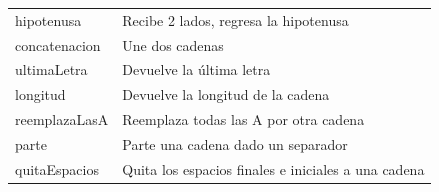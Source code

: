 \documentclass{report}
\begin{document}
\begin{longtable}[c]{@{}ll@{}}
\begin{minipage}[t]{0.47\columnwidth}\raggedright\strut
{hipotenusa}
\strut\end{minipage} & \begin{minipage}[t]{0.47\columnwidth}\raggedright\strut
{Recibe 2 lados, regresa la hipotenusa}
\strut\end{minipage}\tabularnewline
\begin{minipage}[t]{0.47\columnwidth}\raggedright\strut
{concatenacion }
\strut\end{minipage} & \begin{minipage}[t]{0.47\columnwidth}\raggedright\strut
{Une dos cadenas}
\strut\end{minipage}\tabularnewline
\begin{minipage}[t]{0.47\columnwidth}\raggedright\strut
{ultimaLetra}
\strut\end{minipage} & \begin{minipage}[t]{0.47\columnwidth}\raggedright\strut
{Devuelve la última letra}
\strut\end{minipage}\tabularnewline
\begin{minipage}[t]{0.47\columnwidth}\raggedright\strut
{longitud}
\strut\end{minipage} & \begin{minipage}[t]{0.47\columnwidth}\raggedright\strut
{Devuelve la longitud de la cadena}
\strut\end{minipage}\tabularnewline
\begin{minipage}[t]{0.47\columnwidth}\raggedright\strut
{reemplazaLasA}
\strut\end{minipage} & \begin{minipage}[t]{0.47\columnwidth}\raggedright\strut
{Reemplaza todas las A por otra cadena}
\strut\end{minipage}\tabularnewline
\begin{minipage}[t]{0.47\columnwidth}\raggedright\strut
{parte}
\strut\end{minipage} & \begin{minipage}[t]{0.47\columnwidth}\raggedright\strut
{Parte una cadena dado un separador}
\strut\end{minipage}\tabularnewline
\begin{minipage}[t]{0.47\columnwidth}\raggedright\strut
{quitaEspacios}
\strut\end{minipage} & \begin{minipage}[t]{0.47\columnwidth}\raggedright\strut
{Quita los espacios finales e iniciales a una cadena}
\strut\end{minipage}\tabularnewline
\bottomrule
\end{longtable}
\end{document}
